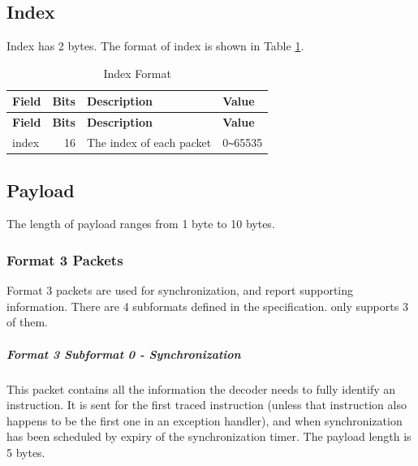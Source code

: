 \documentclass[main\_\_EN.tex]{subfiles}
\begin{document}
\subsection{Index}

Index has 2 bytes. The format of index is shown in Table \ref{tab:index}.

\begin{longtable}[c]{ |l|r|l|l| }
    \caption{Index Format}
    \label{tab:index}
    \\\hline\rowcolor{lightgray}
    \textbf{Field} & \textbf{Bits} & \textbf{Description} & \textbf{Value}\\\hline
    \endfirsthead
    \textbf{Field} & \textbf{Bits} & \textbf{Description} & \textbf{Value}\\\hline
    \endhead
    \endfoot
    \endlastfoot

    index & 16 & The index of each packet & 0\verb+~+65535 \\\hline
 \end{longtable}

\subsection{Payload}

The length of payload ranges from 1 byte to 10 bytes.

\subsubsection{Format 3 Packets}

Format 3 packets are used for synchronization, and report supporting information. There are 4 subformats defined in the specification. \chipname{} only supports 3 of them.

\subparagraph{Format 3 Subformat 0 - Synchronization}\label{sec:riscvtracenc-format-3-sub-0}

This packet contains all the information the decoder needs to fully identify an instruction. It is sent for the first traced instruction (unless that instruction also happens to be the first one in an exception handler), and when synchronization has been scheduled by expiry of the synchronization timer. The payload length is 5 bytes.
\end{document}
